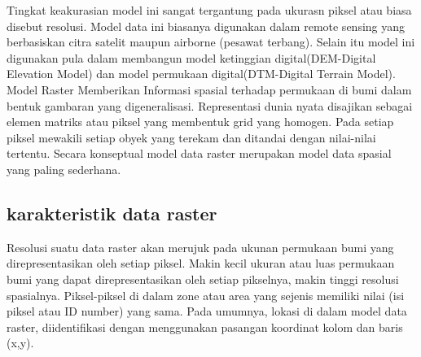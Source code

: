 Tingkat keakurasian model ini sangat tergantung pada ukurasn piksel atau biasa disebut resolusi.
Model data ini biasanya digunakan dalam remote sensing yang berbasiskan citra satelit maupun airborne (pesawat terbang).
Selain itu model ini digunakan pula dalam membangun model ketinggian digital(DEM-Digital Elevation Model) dan model permukaan digital(DTM-Digital Terrain Model).
Model Raster Memberikan Informasi spasial terhadap permukaan di bumi dalam bentuk gambaran yang digeneralisasi.
Representasi dunia nyata disajikan sebagai elemen matriks atau piksel yang membentuk grid  yang homogen. 
Pada setiap piksel mewakili setiap obyek yang terekam dan ditandai dengan nilai-nilai tertentu.
Secara konseptual model data raster merupakan model data spasial yang paling sederhana. 

\subsection{karakteristik data raster}
Resolusi suatu data raster akan merujuk pada ukunan permukaan bumi yang direpresentasikan oleh setiap piksel. 
Makin kecil ukuran atau luas permukaan bumi yang dapat direpresentasikan oleh setiap pikselnya, 
makin tinggi resolusi spasialnya.
Piksel-piksel di dalam zone atau area yang sejenis memiliki nilai (isi piksel atau ID number) yang sama. 
Pada umumnya, lokasi di dalam model data raster, diidentifikasi dengan menggunakan pasangan koordinat kolom dan baris (x,y).

